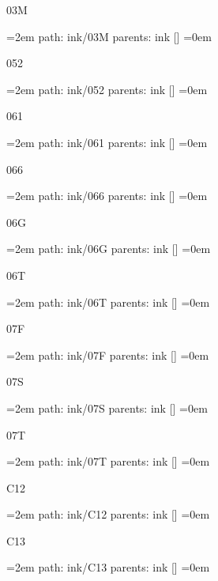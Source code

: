 \bigskip
{}
03M
\smallskip
\par\begingroup
\leftskip=2em
path: ink/03M
\smallskip
parents:  ink []
\smallskip
\leftskip=0em
\par\endgroup
\bigskip
{}
052
\smallskip
\par\begingroup
\leftskip=2em
path: ink/052
\smallskip
parents:  ink []
\smallskip
\leftskip=0em
\par\endgroup
\bigskip
{}
061
\smallskip
\par\begingroup
\leftskip=2em
path: ink/061
\smallskip
parents:  ink []
\smallskip
\leftskip=0em
\par\endgroup
\bigskip
{}
066
\smallskip
\par\begingroup
\leftskip=2em
path: ink/066
\smallskip
parents:  ink []
\smallskip
\leftskip=0em
\par\endgroup
\bigskip
{}
06G
\smallskip
\par\begingroup
\leftskip=2em
path: ink/06G
\smallskip
parents:  ink []
\smallskip
\leftskip=0em
\par\endgroup
\bigskip
{}
06T
\smallskip
\par\begingroup
\leftskip=2em
path: ink/06T
\smallskip
parents:  ink []
\smallskip
\leftskip=0em
\par\endgroup
\bigskip
{}
07F
\smallskip
\par\begingroup
\leftskip=2em
path: ink/07F
\smallskip
parents:  ink []
\smallskip
\leftskip=0em
\par\endgroup
\bigskip
{}
07S
\smallskip
\par\begingroup
\leftskip=2em
path: ink/07S
\smallskip
parents:  ink []
\smallskip
\leftskip=0em
\par\endgroup
\bigskip
{}
07T
\smallskip
\par\begingroup
\leftskip=2em
path: ink/07T
\smallskip
parents:  ink []
\smallskip
\leftskip=0em
\par\endgroup
\bigskip
{}
C12
\smallskip
\par\begingroup
\leftskip=2em
path: ink/C12
\smallskip
parents:  ink []
\smallskip
\leftskip=0em
\par\endgroup
\bigskip
{}
C13
\smallskip
\par\begingroup
\leftskip=2em
path: ink/C13
\smallskip
parents:  ink []
\smallskip
\leftskip=0em
\par\endgroup
